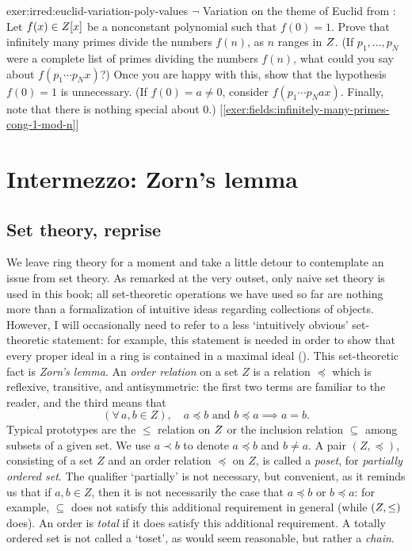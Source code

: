 \begin{exer}{}{exer:irred:euclid-variation-poly-values}
  $\lnot$ Variation on the theme of Euclid from
  : Let $f(x) \in Z[x]$
  be a nonconstant polynomial such that $f(0) = 1$.  Prove that
  infinitely many primes divide the numbers $f(n)$, as $n$ ranges in
  $Z$. (If $p_1, \dots, p_N$ were a complete list of primes dividing
  the numbers $f(n)$, what could you say about $f(p_1 \cdots p_N x)$?)
  Once you are happy with this, show that the hypothesis $f(0) = 1$ is
  unnecessary. (If $f(0) = a \neq 0$, consider
  $f(p_1 \cdots p_N a x)$. Finally, note that there is nothing special
  about $0$.) [\ref{exer:fields:infinitely-many-primes-cong-1-mod-n}]
\end{exer}

\section{Intermezzo: Zorn's lemma}%
\label{sec:irred:intermezzo-zorn-s-lemma}

\subsection{Set theory, reprise}
\label{subsec:irred:set-theory-reprise}
We leave ring theory for a moment and take a little detour to
contemplate an issue from set theory. As remarked at the very outset,
only naive set theory is used in this book; all set-theoretic
operations we have used so far are nothing more than a formalization
of intuitive ideas regarding collections of objects. However, I will
occasionally need to refer to a less `intuitively obvious'
set-theoretic statement: for example, this statement is needed in
order to show that every proper ideal in a ring is contained in a
maximal ideal (). This set-theoretic fact is
\emph{Zorn's lemma}. An \emph{order relation} on a set $Z$ is a
relation $\preceq$ which is reflexive, transitive, and antisymmetric:
the first two terms are familiar to the reader, and the third means
that
\[(\forall\, a, b \in Z),\quad a \preceq b \text{ and } b \preceq a
  \implies a = b.\] Typical prototypes are the $\leq$ relation on $Z$
or the inclusion relation $\subseteq$ among subsets of a given set. We
use $a \prec b$ to denote $a \preceq b$ and $b \neq a$.  A pair
$(Z, \preceq)$, consisting of a set $Z$ and an order relation
$\preceq$ on $Z$, is called a \emph{poset}, for \emph{partially
  ordered set}. The qualifier `partially' is not necessary, but
convenient, as it reminds us that if $a, b \in Z$, then it is not
necessarily the case that $a \preceq b$ or $b \preceq a$: for example,
$\subseteq$ does not satisfy this additional requirement in general
(while $(Z, \leq)$ does).  An order is \emph{total} if it does
satisfy this additional requirement. A totally ordered set is not
called a `toset', as would seem reasonable, but rather a \emph{chain}.

